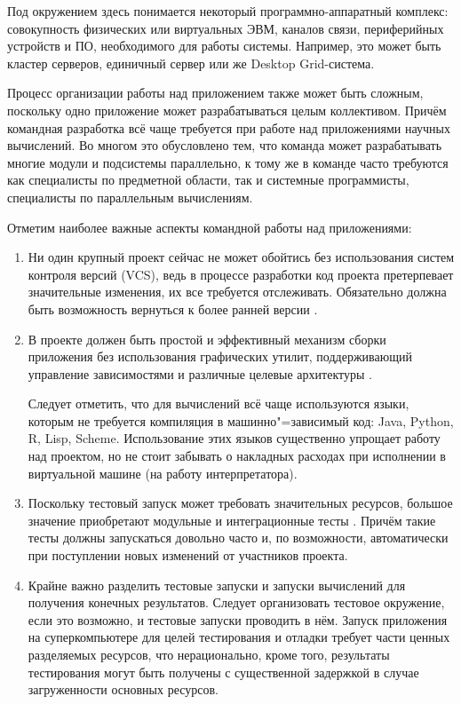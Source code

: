 Под окружением здесь понимается некоторый программно-аппаратный комплекс: совокупность физических или виртуальных ЭВМ, каналов связи, периферийных устройств и ПО, необходимого для работы системы. Например, это может быть кластер серверов, единичный сервер или же Desktop Grid-система.



Процесс организации работы над приложением также может быть сложным, поскольку одно приложение может разрабатываться целым коллективом. Причём командная разработка всё чаще требуется при работе над приложениями научных вычислений. Во многом это обусловлено тем, что команда может разрабатывать многие модули и подсистемы параллельно, к тому же в команде часто требуются как специалисты по предметной области, так и системные программисты, специалисты по параллельным вычислениям.



Отметим наиболее важные аспекты командной работы над приложениями:

\begin{enumerate}

\item[1.] Ни один крупный проект сейчас не может обойтись без использования систем контроля версий (VCS), ведь в процессе разработки код проекта претерпевает значительные изменения, их все требуется отслеживать. Обязательно должна быть возможность вернуться к более ранней версии \cite{Sullivan2009RCS}.

\item[2.] В проекте должен быть простой и эффективный механизм сборки приложения без использования графических утилит, поддерживающий \linebreak управление зависимостями и различные целевые архитектуры \cite{Neitsch2012Build}. 

Следует отметить, что для вычислений всё чаще используются языки, которым не требуется компиляция в машинно"=зависимый код: Java, Py\-thon, R, Lisp, Scheme. Использование этих языков существенно упрощает работу над проектом, но не стоит забывать о накладных расходах при исполнении в виртуальной машине (на работу интерпретатора).

\item[3.] Поскольку тестовый запуск может требовать значительных ресурсов, большое значение приобретают модульные и интеграционные тесты \cite{Ettl2012CI}. Причём такие тесты должны запускаться довольно часто и, по возможности, автоматически при поступлении новых изменений от участников проекта.

\item[4.] Крайне важно разделить тестовые запуски и запуски вычислений для получения конечных результатов. Следует организовать тестовое окружение, если это возможно, и тестовые запуски проводить в нём. Запуск приложения на суперкомпьютере для целей тестирования и отладки требует части ценных разделяемых ресурсов, что нерационально, кроме того, результаты тестирования могут быть получены с существенной задержкой в случае загруженности основных ресурсов.

\end{enumerate}



